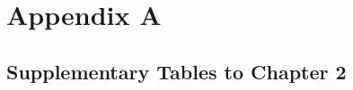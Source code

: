 \setlength{\headheight}{1.2cm}
\renewcommand{\publ}{\flushleft\footnotesize{}}

\chapter*{Appendix A}\label{app:A}
\renewcommand{\thesection}{A.\arabic{section}}
\renewcommand{\thetable}{A.\arabic{table}}

\section{Supplementary Tables to Chapter 2}

